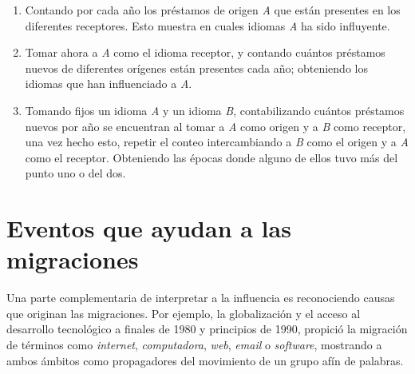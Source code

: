 \begin{enumerate}
	\label{proceso.nuevos}
	
\item Contando por cada año los préstamos de origen \textit{A} que están
presentes en los diferentes receptores. Esto muestra en cuales idiomas \textit{A}
ha sido influyente. 

\item Tomar ahora a \textit{A}  como el idioma receptor, y contando cuántos
préstamos nuevos de diferentes orígenes están presentes cada año; obteniendo
los idiomas que han influenciado a \textit{A}.  

\item Tomando fijos un idioma \textit{A} y un idioma \textit{B}, contabilizando
cuántos préstamos nuevos por año se encuentran al tomar a  \textit{A} como
origen y a \textit{B} como receptor,  una vez hecho esto,  repetir el conteo
intercambiando a \textit{B} como el origen y a \textit{A} como el receptor.
Obteniendo las épocas donde alguno de ellos tuvo más del punto uno o del dos. 

\end{enumerate}


\section{Eventos que ayudan a las migraciones} %

Una parte complementaria de interpretar a la influencia es reconociendo causas
que originan las migraciones. Por ejemplo, la globalización y el acceso al
desarrollo tecnológico a finales de 1980 y principios de 1990, propició la
migración  de términos como \textit{internet}, \textit{computadora},
\textit{web}, \textit{email} o \textit{software}, mostrando a ambos ámbitos
como propagadores del movimiento de un grupo afín de palabras.

